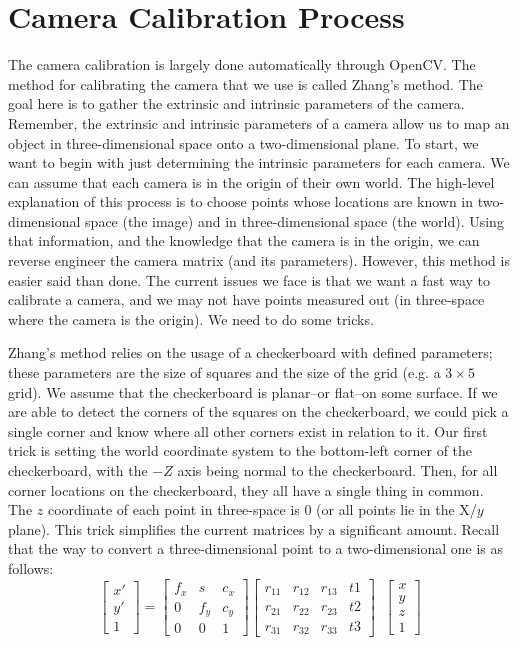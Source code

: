 \documentclass[
    12pt,
    twoside,
    bibstyle=chicago,
    headerstyle=uppercase,
	bibfile=thesis.bib
]{reedthesis}
\begin{document}
\section{Camera Calibration Process}
The camera calibration is largely done automatically through OpenCV. The method for calibrating the camera that we use is called Zhang's method. The goal here is to gather the extrinsic and intrinsic parameters of the camera. Remember, the extrinsic and intrinsic parameters of a camera allow us to map an object in three-dimensional space onto a two-dimensional plane. To start, we want to begin with just determining the intrinsic parameters for each camera. We can assume that each camera is in the origin of their own world. The high-level explanation of this process is to choose points whose locations are known in two-dimensional space (the image) and in three-dimensional space (the world). Using that information, and the knowledge that the camera is in the origin, we can reverse engineer the camera matrix (and its parameters). However, this method is easier said than done. The current issues we face is that we want a fast way to calibrate a camera, and we may not have points measured out (in three-space where the camera is the origin). We need to do some tricks.

Zhang's method relies on the usage of a checkerboard with defined parameters; these parameters are the size of squares and the size of the grid (e.g. a $3\times5$ grid). We assume that the checkerboard is planar--or flat--on some surface. If we are able to detect the corners of the squares on the checkerboard, we could pick a single corner and know where all other corners exist in relation to it. Our first trick is setting the world coordinate system to the bottom-left corner of the checkerboard, with the $-Z$ axis being normal to the checkerboard. Then, for all corner locations on the checkerboard, they all have a single thing in common. The $z$ coordinate of each point in three-space is 0 (or all points lie in the X/$y$ plane). This trick simplifies the current matrices by a significant amount. Recall that the way to convert a three-dimensional point to a two-dimensional one is as follows:
\[\begin{bmatrix}x' \\ y' \\ 1\end{bmatrix} = \begin{bmatrix}f_x & s & c_x \\ 0 & f_y & c_y \\ 0 & 0 & 1\end{bmatrix} \begin{bmatrix} r_{11}&r_{12}&r_{13}&t{1}\\r_{21}&r_{22}&r_{23}&t{2}\\r_{31}&r_{32}&r_{33}&t{3}\end{bmatrix}\;\;\begin{bmatrix}x \\ y \\ z \\ 1\end{bmatrix}\]
\end{document}

